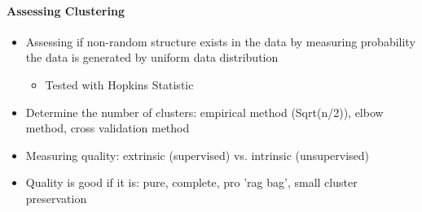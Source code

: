 \documentclass[11pt]{article}
\providecommand{\tightlist}{%
      \setlength{\itemsep}{0pt}\setlength{\parskip}{0pt}}
\begin{document}
    \paragraph{Assessing Clustering}\label{assessing-clustering}

    \begin{itemize}
\tightlist
\item
  Assessing if non-random structure exists in the data by measuring
  probability the data is generated by uniform data distribution

  \begin{itemize}
  \tightlist
  \item
    Tested with Hopkins Statistic
  \end{itemize}
\item
  Determine the number of clusters: empirical method (Sqrt(n/2)), elbow
  method, cross validation method
\item
  Measuring quality: extrinsic (supervised) vs. intrinsic (unsupervised)
\item
  Quality is good if it is: pure, complete, pro 'rag bag', small cluster
  preservation
\end{itemize}


    
    
    
    
\end{document}
